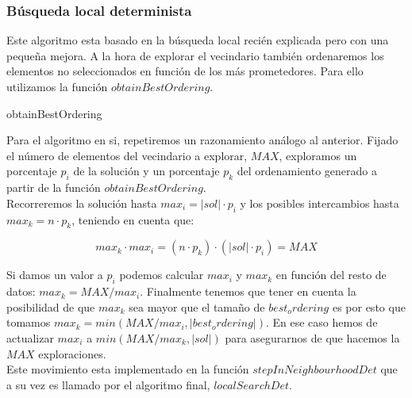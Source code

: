 \documentclass[11pt,a4paper]{article}
\begin{document}
	\subsubsection{Búsqueda local determinista} \label{LSD}
	
	Este algoritmo esta basado en la búsqueda local recién explicada pero con una pequeña mejora. A la hora de explorar el vecindario también ordenaremos los elementos no seleccionados en función de los más prometedores. Para ello utilizamos la función $obtainBestOrdering$. \\
	
	\begin{algorithm}[H]
		\caption{obtainBestOrdering}
	\end{algorithm}
	
	Para el algoritmo en si, repetiremos un razonamiento análogo al anterior. Fijado el número de elementos del vecindario a explorar, $MAX$, exploramos un porcentaje $p_i$ de la solución y un porcentaje $p_k$ del ordenamiento generado a partir de la función $obtainBestOrdering$. \\
	
	Recorreremos la solución hasta $max_i = |sol| \cdot p_i$ y los posibles intercambios hasta $max_k = n \cdot p_k$, teniendo en cuenta que:
	
	$$ max_k \cdot max_i = (n \cdot p_k) \cdot (|sol| \cdot p_i) = MAX$$ 
	
	Si damos un valor a $p_i$ podemos calcular $max_i$ y $max_k$ en función del resto de datos: $ max_k = MAX / max_i $. Finalmente tenemos que tener en cuenta la posibilidad de que $max_k$ sea mayor que el tamaño de $best_ordering$ es por esto que tomamos $max_k = min(MAX / max_i , |best_ordering|)$. En ese caso hemos de actualizar $max_i$ a $min(MAX / max_k, |sol|)$ para asegurarnos de que hacemos la $MAX$ exploraciones. \\ 
	
	Este movimiento esta implementado en la función $stepInNeighbourhoodDet$ que a su vez es llamado por el algoritmo final, $localSearchDet$. \\
	
\end{document}
